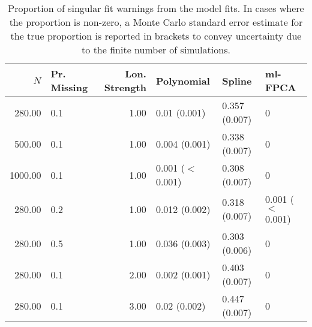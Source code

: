 \begin{table}[ht]
\centering
\begin{tabular}{rlrlll}
  \toprule
{\bfseries \small $N$} & {\bfseries \small Pr. Missing} & {\bfseries \small Lon. Strength} & {\bfseries \small Polynomial} & {\bfseries \small Spline} & {\bfseries \small ml-FPCA} \\ 
  \midrule
280.00 & 0.1 & 1.00 & 0.01 (0.001) & 0.357 (0.007) & 0 \\ 
  500.00 & 0.1 & 1.00 & 0.004 (0.001) & 0.338 (0.007) & 0 \\ 
  1000.00 & 0.1 & 1.00 & 0.001 ($<$ 0.001) & 0.308 (0.007) & 0 \\ 
  280.00 & 0.2 & 1.00 & 0.012 (0.002) & 0.318 (0.007) & 0.001 ($<$ 0.001) \\ 
  280.00 & 0.5 & 1.00 & 0.036 (0.003) & 0.303 (0.006) & 0 \\ 
  280.00 & 0.1 & 2.00 & 0.002 (0.001) & 0.403 (0.007) & 0 \\ 
  280.00 & 0.1 & 3.00 & 0.02 (0.002) & 0.447 (0.007) & 0 \\ 
   \bottomrule
\end{tabular}
\caption{Proportion of singular fit warnings from the model fits. In cases where the proportion is non-zero, a Monte Carlo standard error estimate for the true proportion is reported in brackets to convey uncertainty due to the finite number of simulations.} 
\label{tab:singularity-table}
\end{table}
